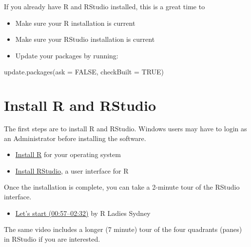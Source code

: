 \documentclass[
]{book}
\newenvironment{Shaded}{\begin{snugshade}}{\end{snugshade}}
\newcommand{\AttributeTok}[1]{\textcolor[rgb]{0.77,0.63,0.00}{#1}}
\newcommand{\ConstantTok}[1]{\textcolor[rgb]{0.00,0.00,0.00}{#1}}
\newcommand{\FunctionTok}[1]{\textcolor[rgb]{0.00,0.00,0.00}{#1}}
\newcommand{\NormalTok}[1]{#1}
\providecommand{\tightlist}{%
  \setlength{\itemsep}{0pt}\setlength{\parskip}{0pt}}
\begin{document}
If you already have R and RStudio installed, this is a great time to

\begin{itemize}
\tightlist
\item
  Make sure your R installation is current
\item
  Make sure your RStudio installation is current
\item
  Update your packages by running:
\end{itemize}

\begin{Shaded}
\begin{Highlighting}[]
\FunctionTok{update.packages}\NormalTok{(}\AttributeTok{ask =} \ConstantTok{FALSE}\NormalTok{, }\AttributeTok{checkBuilt =} \ConstantTok{TRUE}\NormalTok{)}
\end{Highlighting}
\end{Shaded}

\hypertarget{install-r-and-rstudio}{%
\section*{Install R and RStudio}\label{install-r-and-rstudio}}

The first steps are to install R and RStudio. Windows users may have to login as an Administrator before installing the software.

\begin{itemize}
\tightlist
\item
  \href{https://cloud.r-project.org}{Install R} for your operating system\\
\item
  \href{https://www.rstudio.com/products/rstudio/\#Desktop}{Install RStudio}, a user interface for R
\end{itemize}

Once the installation is complete, you can take a 2-minute tour of the RStudio interface.

\begin{itemize}
\tightlist
\item
  \href{https://www.youtube.com/embed/kfcX5DEMAp4?start=57\&end=152}{Let's start (00:57--02:32)} by R Ladies Sydney \citep{RLadiesSydney:2018:Lesson1}
\end{itemize}

The same video includes a longer (7 minute) tour of the four quadrants (panes) in RStudio if you are interested.
\end{document}
